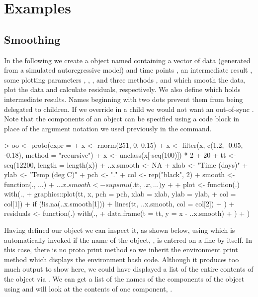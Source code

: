 \documentclass{Z}
\begin{document}
\pagebreak[4]

\section{Examples} 
\label{sec:examples}

\subsection{Smoothing}
\label{sec:smooth}

In the following we create a  object named 
containing a vector of data  (generated from a simulated
autoregressive model) and time points
, an intermediate result
, some plotting parameters , ,
,  and three methods , 
and  which smooth the data, plot the data and
calculate residuals, respectively.  We also define 
which holds intermediate results.  Names beginning with two dots
prevent them from being delegated to children.  If we override
 in a child we would not want an out-of-sync .
Note that the components of an object can be specified using a code
block in place of the argument notation we used previously in the
 command.

\begin{Schunk}
\begin{Sinput}
> oo <- proto(expr = {
+     x <- rnorm(251, 0, 0.15)
+     x <- filter(x, c(1.2, -0.05, -0.18), method = "recursive")
+     x <- unclass(x[-seq(100)]) * 2 + 20
+     tt <- seq(12200, length = length(x))
+     ..x.smooth <- NA
+     xlab <- "Time (days)"
+     ylab <- "Temp (deg C)"
+     pch <- "."
+     col <- rep("black", 2)
+     smooth <- function(., ...) {
+         .$..x.smooth <- supsmu(.$tt, .$x, ...)$y
+     }
+     plot <- function(.) with(., {
+         graphics::plot(tt, x, pch = pch, xlab = xlab, ylab = ylab, 
+             col = col[1])
+         if (!is.na(..x.smooth[1])) 
+             lines(tt, ..x.smooth, col = col[2])
+     })
+     residuals <- function(.) with(., {
+         data.frame(t = tt, y = x - ..x.smooth)
+     })
+ })
\end{Sinput}
\end{Schunk}

Having defined our  object we can inspect it, as shown
below, using 
 which is automatically invoked if the
name of the object, , is entered on a line by itself.  
In this case, there is no proto print method so we inherit the
environment print method which displays the environment hash code.  
Although it produces too much output to show here,
we could have displayed a 
list of the entire contents of the object 
via .
We can get a list of the names of the 
components of the object using  and will look
at the contents of one component, .
\end{document}
